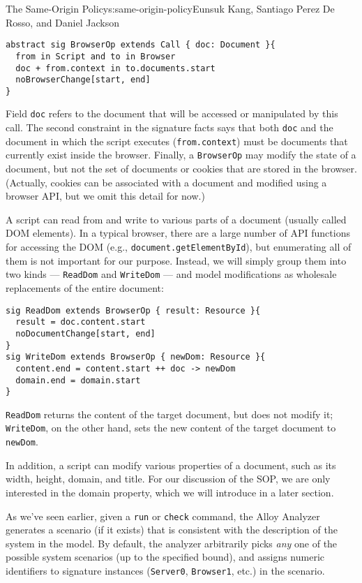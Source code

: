\begin{aosachapter}{The Same-Origin Policy}{s:same-origin-policy}{Eunsuk Kang, Santiago Perez De Rosso, and Daniel Jackson}
\begin{verbatim}
abstract sig BrowserOp extends Call { doc: Document }{
  from in Script and to in Browser
  doc + from.context in to.documents.start
  noBrowserChange[start, end]
}
\end{verbatim}

Field \texttt{doc} refers to the document that will be accessed or
manipulated by this call. The second constraint in the signature facts
says that both \texttt{doc} and the document in which the script
executes (\texttt{from.context}) must be documents that currently exist
inside the browser. Finally, a \texttt{BrowserOp} may modify the state
of a document, but not the set of documents or cookies that are stored
in the browser. (Actually, cookies can be associated with a document and
modified using a browser API, but we omit this detail for now.)

A script can read from and write to various parts of a document (usually
called DOM elements). In a typical browser, there are a large number of
API functions for accessing the DOM (e.g.,
\texttt{document.getElementById}), but enumerating all of them is not
important for our purpose. Instead, we will simply group them into two
kinds --- \texttt{ReadDom} and \texttt{WriteDom} --- and model
modifications as wholesale replacements of the entire document:

\begin{verbatim}
sig ReadDom extends BrowserOp { result: Resource }{
  result = doc.content.start
  noDocumentChange[start, end]
}
sig WriteDom extends BrowserOp { newDom: Resource }{
  content.end = content.start ++ doc -> newDom
  domain.end = domain.start
}
\end{verbatim}

\texttt{ReadDom} returns the content of the target document, but does
not modify it; \texttt{WriteDom}, on the other hand, sets the new
content of the target document to \texttt{newDom}.

In addition, a script can modify various properties of a document, such
as its width, height, domain, and title. For our discussion of the SOP,
we are only interested in the domain property, which we will introduce
in a later section.

\label{example-applications}

As we've seen earlier, given a \texttt{run} or \texttt{check} command,
the Alloy Analyzer generates a scenario (if it exists) that is
consistent with the description of the system in the model. By default,
the analyzer arbitrarily picks \emph{any} one of the possible system
scenarios (up to the specified bound), and assigns numeric identifiers
to signature instances (\texttt{Server0}, \texttt{Browser1}, etc.) in
the scenario.


\end{aosachapter}
